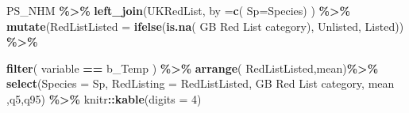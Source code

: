 \documentclass[
]{article}
\newenvironment{Shaded}{\begin{snugshade}}{\end{snugshade}}
\newcommand{\AttributeTok}[1]{\textcolor[rgb]{0.13,0.29,0.53}{#1}}
\newcommand{\DecValTok}[1]{\textcolor[rgb]{0.00,0.00,0.81}{#1}}
\newcommand{\FunctionTok}[1]{\textcolor[rgb]{0.13,0.29,0.53}{\textbf{#1}}}
\newcommand{\NormalTok}[1]{#1}
\newcommand{\OtherTok}[1]{\textcolor[rgb]{0.56,0.35,0.01}{#1}}
\newcommand{\SpecialCharTok}[1]{\textcolor[rgb]{0.81,0.36,0.00}{\textbf{#1}}}
\newcommand{\StringTok}[1]{\textcolor[rgb]{0.31,0.60,0.02}{#1}}
\begin{document}
\begin{Shaded}
\begin{Highlighting}[]
\NormalTok{PS\_NHM }\SpecialCharTok{\%\textgreater{}\%}
  \FunctionTok{left\_join}\NormalTok{(UKRedList, }\AttributeTok{by =}\FunctionTok{c}\NormalTok{( }\StringTok{\textquotesingle{}Sp\textquotesingle{}}\OtherTok{=}\StringTok{\textquotesingle{}Species\textquotesingle{}}\NormalTok{) ) }\SpecialCharTok{\%\textgreater{}\%}
  \FunctionTok{mutate}\NormalTok{(}\AttributeTok{RedListListed =} \FunctionTok{ifelse}\NormalTok{(}\FunctionTok{is.na}\NormalTok{( }\StringTok{\textasciigrave{}}\AttributeTok{GB Red List category}\StringTok{\textasciigrave{}}\NormalTok{),}
                                \StringTok{\textquotesingle{}Unlisted\textquotesingle{}}\NormalTok{,}
                                \StringTok{\textquotesingle{}Listed\textquotesingle{}}\NormalTok{)) }\SpecialCharTok{\%\textgreater{}\%} 

  \FunctionTok{filter}\NormalTok{( variable }\SpecialCharTok{==} \StringTok{\textquotesingle{}b\_Temp\textquotesingle{}}\NormalTok{ ) }\SpecialCharTok{\%\textgreater{}\%}
  \FunctionTok{arrange}\NormalTok{(  RedListListed,mean)}\SpecialCharTok{\%\textgreater{}\%}
  \FunctionTok{select}\NormalTok{(}\AttributeTok{Species =}\NormalTok{ Sp, }\AttributeTok{RedListing =}\NormalTok{ RedListListed,}
         \StringTok{\textasciigrave{}}\AttributeTok{GB Red List category}\StringTok{\textasciigrave{}}\NormalTok{, mean ,q5,q95) }\SpecialCharTok{\%\textgreater{}\%}
\NormalTok{  knitr}\SpecialCharTok{::}\FunctionTok{kable}\NormalTok{(}\AttributeTok{digits =} \DecValTok{4}\NormalTok{)}
\end{Highlighting}
\end{Shaded}
\end{document}
